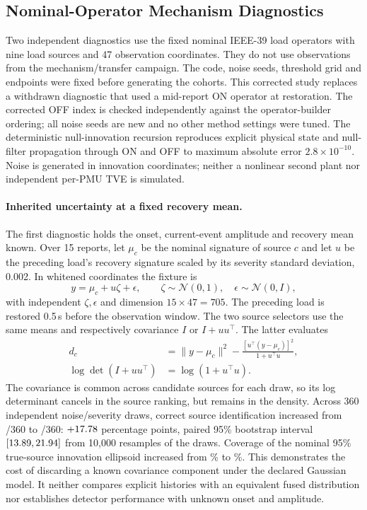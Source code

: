 
\subsection{Nominal-Operator Mechanism Diagnostics}
Two independent diagnostics use the fixed nominal IEEE-39 load operators
with nine load sources and 47 observation coordinates. They do not use
observations from the mechanism/transfer campaign. The code, noise seeds,
threshold grid and endpoints were fixed before generating the cohorts.
This corrected study replaces a withdrawn diagnostic that used a mid-report
ON operator at restoration. The corrected OFF index is checked independently
against the operator-builder ordering; all noise seeds are new and no other
method settings were tuned.
The deterministic null-innovation recursion reproduces explicit physical
state and null-filter propagation through ON and OFF to maximum absolute
error $2.8\times10^{-10}$. Noise is generated in innovation coordinates;
neither a nonlinear second plant nor independent per-PMU TVE is simulated.

\paragraph{Inherited uncertainty at a fixed recovery mean.}
The first diagnostic holds the onset, current-event amplitude and recovery
mean known. Over 15 reports, let $\mu_c$ be the nominal signature of source
$c$ and let $u$ be the preceding load's recovery signature scaled by its
severity standard deviation, 0.002. In whitened coordinates the fixture is
\begin{equation}
 y=\mu_c+u\zeta+\epsilon,\qquad
 \zeta\sim\mathcal N(0,1),\quad\epsilon\sim\mathcal N(0,I),
 \label{eq:cov-fixture}
\end{equation}
with independent $\zeta,\epsilon$ and dimension $15\times47=705$.
The preceding load is restored 0.5\,s before the observation window.
The two source selectors use the same means and respectively covariance
$I$ or $I+uu^\top$. The latter evaluates
\begin{align}
 d_c&=\|y-\mu_c\|^2-
 \frac{[u^\top(y-\mu_c)]^2}{1+u^\top u},\nonumber\\
 \log\det(I+uu^\top)&=\log(1+u^\top u).
\end{align}
The covariance is common across candidate sources for each draw, so its
log determinant cancels in the source ranking, but remains in the density.
Across 360 independent noise/severity draws, correct source identification
increased from \CovMeanHits{}/360 to \CovCarryHits{}/360:
$+17.78{}$ percentage points, paired 95\% bootstrap interval
$[13.89{},21.94{}]$ from 10,000 resamples of the draws.
Coverage of the nominal 95\% true-source innovation ellipsoid increased
from \CovNisMean{}\% to \CovNisCarry{}\%.
This demonstrates the cost of discarding a known covariance component under
the declared Gaussian model. It neither compares explicit histories with
an equivalent fused distribution nor establishes detector performance with
unknown onset and amplitude.

